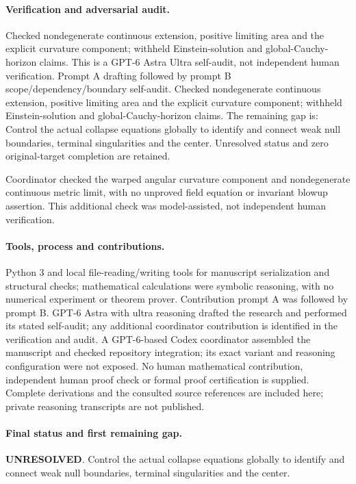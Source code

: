 \documentclass[11pt]{article}
\begin{document}
\paragraph{Verification and adversarial audit.}
Checked nondegenerate continuous extension, positive limiting area and the explicit curvature component; withheld Einstein-solution and global-Cauchy-horizon claims. This is a GPT-6 Astra Ultra self-audit, not independent human verification. Prompt A drafting followed by prompt B scope/dependency/boundary self-audit. Checked nondegenerate continuous extension, positive limiting area and the explicit curvature component; withheld Einstein-solution and global-Cauchy-horizon claims. The remaining gap is: Control the actual collapse equations globally to identify and connect weak null boundaries, terminal singularities and the center. Unresolved status and zero original-target completion are retained.

Coordinator checked the warped angular curvature component and nondegenerate continuous metric limit, with no unproved field equation or invariant blowup assertion. This additional check was model-assisted, not independent human verification.

\paragraph{Tools, process and contributions.}
Python 3 and local file-reading/writing tools for manuscript serialization and structural checks; mathematical calculations were symbolic reasoning, with no numerical experiment or theorem prover. Contribution prompt A was followed by prompt B. GPT-6 Astra with ultra reasoning drafted the research and performed its stated self-audit; any additional coordinator contribution is identified in the verification and audit. A GPT-6-based Codex coordinator assembled the manuscript and checked repository integration; its exact variant and reasoning configuration were not exposed. No human mathematical contribution, independent human proof check or formal proof certification is supplied. Complete derivations and the consulted source references are included here; private reasoning transcripts are not published.

\paragraph{Final status and first remaining gap.}
\textbf{UNRESOLVED}. Control the actual collapse equations globally to identify and connect weak null boundaries, terminal singularities and the center.
\end{document}
